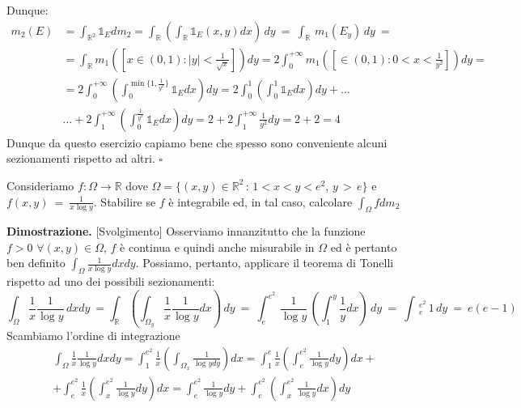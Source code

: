 	Dunque:
	\[\begin{aligned}
	m_2(E) 
	&= \int_{\mathbb{R}^2} \mathbb{1}_E dm_2 = \int_{\mathbb{R}} \left( \int_{\mathbb{R}} \mathbb{1}_E(x,y)dx \right)\, dy\ =\ \int_{\mathbb{R}}\, m_1(E_y)\, dy\ = \\
	&=\int_{\mathbb{R}} m_1 \left( \left[x \in (0, 1) : |y| < \frac{1}{\sqrt{x}} \right] \right)dy =2 \int_0^{+\infty} m_1 \left( \left[ \in (0,1) : 0 < x < \frac{1}{y^2} \right] \right)dy = \\
	&=2 \int_0^{+\infty} \left( \int_0^{\min\{1, \frac{1}{y^2}\}} \mathbb{1}_E dx \right)dy = 2 \int_0^1 \left( \int_0^1 \mathbb{1}_E dx \right)dy + \dots\\
	&\dots + 2\int_1^{+\infty} \left( \int_0^{\frac{1}{y^2}} \mathbb{1}_E dx \right)dy = 2 + 2\int_1^{+\infty} \frac{1}{y^2}dy = 2 + 2 = 4
	\end{aligned}\]
	Dunque da questo esercizio capiamo bene che spesso sono conveniente alcuni sezionamenti rispetto ad altri.
\hfill $\square$
%
\vspace{0.5cm}
\begin{exercise}
	Consideriamo $f: \Omega \to \mathbb{R}$ dove $\Omega = \{(x, y) \in \mathbb{R}^2\, :\, 1 < x < y < e^2,\, y\, >\, e \}$ e $f(x,y)\ =\ \frac{1}{x\log y}$. 
	Stabilire se $f$ è integrabile ed, in tal caso, calcolare $\int_\Omega f dm_2$
\end{exercise}
%
\noindent \textbf{Dimostrazione. }[Svolgimento]
	Osserviamo innanzitutto che la funzione $f > 0 \, \, \forall (x, y) \in \Omega$, $f$ è continua e quindi anche misurabile in $\Omega$ ed è pertanto ben definito $\int_\Omega \frac{1}{x\log{y}}dxdy$. Possiamo, pertanto, applicare il teorema di Tonelli rispetto ad uno dei possibili sezionamenti:
	\[ \int_\Omega \frac{1}{x} \frac{1}{\log{y}}\, dxdy\ = \int_{\mathbb{R}} \left( \int_{\Omega_y} \frac{1}{x}\frac{1}{\log{y}} dx \right)\, dy\ =\ \int_e^{e^2}\, \frac{1}{\log{y}}\, \left( \int_1^y \frac{1}{y} dx \right)\, dy\ =\ \int\,_e^{e^2}\, 1\, dy\ =\ e(e-1) \]
	Scambiamo l'ordine di integrazione
	\[\begin{aligned}
	&\int_\Omega \frac{1}{x} \frac{1}{\log{y}}dxdy = \int_1^{e^2} \frac{1}{x} \left( \int_{\Omega_x} \frac{1}{\log{y}dy} \right)dx =\int_1^e \frac{1}{x} \left( \int_e^{e^2} \frac{1}{\log{y}}dy \right) dx + \\
	&+\int_e^{e^2} \frac{1}{x} \left( \int_x^{e^2} \frac{1}{\log{y}}dy \right)dx = \int_e^{e^2} \frac{1}{\log{y}}dy + \int_e^{e^2} \left( \int_x^{e^2} \frac{1}{\log{y}}dx \right) dy
	\end{aligned}\]
